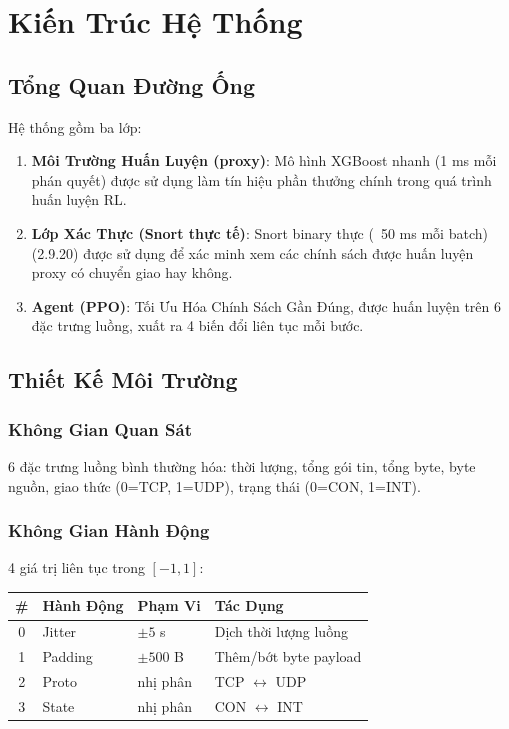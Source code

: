 \documentclass[12pt,a4paper]{report}
\begin{document}
\chapter{Kiến Trúc Hệ Thống}

\section{Tổng Quan Đường Ống}

Hệ thống gồm ba lớp:

\begin{enumerate}
  \item \textbf{Môi Trường Huấn Luyện (proxy)}: Mô hình XGBoost nhanh (1 ms mỗi phán quyết) được sử dụng làm tín hiệu phần thưởng chính trong quá trình huấn luyện RL.
  
  \item \textbf{Lớp Xác Thực (Snort thực tế)}: Snort binary thực (~50 ms mỗi batch) (2.9.20) được sử dụng để xác minh xem các chính sách được huấn luyện proxy có chuyển giao hay không.
  
  \item \textbf{Agent (PPO)}: Tối Ưu Hóa Chính Sách Gần Đúng, được huấn luyện trên 6 đặc trưng luồng, xuất ra 4 biến đổi liên tục mỗi bước.
\end{enumerate}

\section{Thiết Kế Môi Trường}

\subsection{Không Gian Quan Sát}

6 đặc trưng luồng bình thường hóa: thời lượng, tổng gói tin, tổng byte, byte nguồn, giao thức (0=TCP, 1=UDP), trạng thái (0=CON, 1=INT).

\subsection{Không Gian Hành Động}

4 giá trị liên tục trong $[-1, 1]$:

\begin{table}[h]
\centering
\begin{tabular}{c|l|l|l}
\# & Hành Động & Phạm Vi & Tác Dụng \\
\hline
0 & Jitter & $\pm 5$ s & Dịch thời lượng luồng \\
1 & Padding & $\pm 500$ B & Thêm/bớt byte payload \\
2 & Proto & nhị phân & TCP $\leftrightarrow$ UDP \\
3 & State & nhị phân & CON $\leftrightarrow$ INT \\
\end{tabular}
\end{table}
\end{document}
